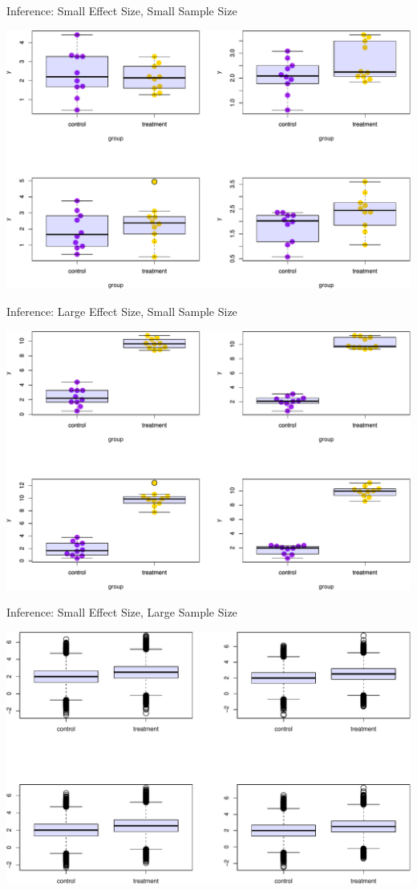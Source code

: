 \documentclass[ignorenonframetext,]{beamer}
\begin{document}
\begin{frame}{Inference: Small Effect Size, Small Sample Size}
\protect\hypertarget{inference-small-effect-size-small-sample-size}{}

\includegraphics{biostats_I_files/figure-beamer/unnamed-chunk-5-1.pdf}

\end{frame}

\begin{frame}{Inference: Large Effect Size, Small Sample Size}
\protect\hypertarget{inference-large-effect-size-small-sample-size}{}

\includegraphics{biostats_I_files/figure-beamer/unnamed-chunk-6-1.pdf}

\end{frame}

\begin{frame}{Inference: Small Effect Size, Large Sample Size}
\protect\hypertarget{inference-small-effect-size-large-sample-size}{}

\includegraphics{biostats_I_files/figure-beamer/unnamed-chunk-7-1.pdf}

\end{frame}
\end{document}
